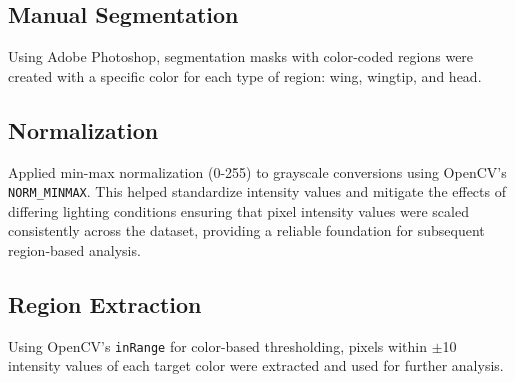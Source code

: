 \documentclass[a4paper,12pt]{report}
\begin{document}
\subsection{Manual Segmentation}
Using Adobe Photoshop, segmentation masks with color-coded regions were created with a specific color for each type of region: wing, wingtip, and head.

\subsection{Normalization}
Applied min-max normalization\citep{monzon_image_normalization} (0-255) to grayscale conversions using OpenCV's \texttt{NORM\_MINMAX}.
This helped standardize intensity values and mitigate the effects of differing lighting conditions ensuring that pixel intensity values were scaled consistently across the dataset, providing a reliable foundation for subsequent region-based analysis.

\subsection{Region Extraction}

Using OpenCV's \texttt{inRange} for color-based thresholding, pixels within $\pm$10 intensity values of each target color were extracted and used for further analysis.







\end{document}
